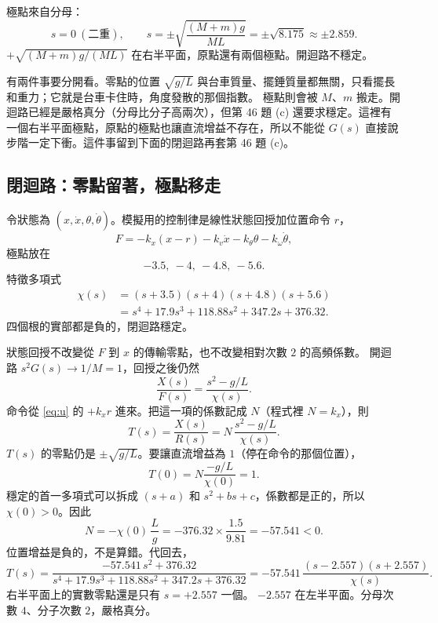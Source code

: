 \documentclass[12pt,a4paper]{article}
\begin{document}
極點來自分母：
\begin{equation}
  s=0\ (\text{二重}),\qquad
  s=\pm\sqrt{\frac{(M+m)g}{ML}}
   =\pm\sqrt{8.175}\approx\pm 2.859.
  \label{eq:ol-poles}
\end{equation}
\(+\sqrt{(M+m)g/(ML)}\) 在右半平面，原點還有兩個極點。開迴路不穩定。

有兩件事要分開看。零點的位置 \(\sqrt{g/L}\) 與台車質量、擺錘質量都無關，只看擺長和重力；它就是台車卡住時，角度發散的那個指數。
極點則會被 \(M\)、\(m\) 搬走。開迴路已經是嚴格真分（分母比分子高兩次），但第 46 題 (c) 還要求穩定。這裡有一個右半平面極點，原點的極點也讓直流增益不存在，所以不能從 \(G(s)\) 直接說步階一定下衝。這件事留到下面的閉迴路再套第 46 題 (c)。

\subsection{閉迴路：零點留著，極點移走}

令狀態為 \((x,\dot x,\theta,\dot\theta)\)。模擬用的控制律是線性狀態回授加位置命令 \(r\)，
\begin{equation}
  F=-k_x(x-r)-k_v\dot x-k_\theta\theta-k_\omega\dot\theta,
  \label{eq:u}
\end{equation}
極點放在
\[
  -3.5,\ -4,\ -4.8,\ -5.6.
\]
特徵多項式
\begin{align}
  \chi(s)&=(s+3.5)(s+4)(s+4.8)(s+5.6) \nonumber\\
         &=s^4+17.9s^3+118.88s^2+347.2s+376.32.
  \label{eq:chi}
\end{align}
四個根的實部都是負的，閉迴路穩定。

狀態回授不改變從 \(F\) 到 \(x\) 的傳輸零點，也不改變相對次數 \(2\) 的高頻係數。
開迴路 \(s^2G(s)\to 1/M=1\)，回授之後仍然
\[
  \frac{X(s)}{F(s)}=\frac{s^2-g/L}{\chi(s)}.
\]
命令從 \eqref{eq:u} 的 \(+k_x r\) 進來。把這一項的係數記成 \(N\)（程式裡 \(N=k_x\)），則
\begin{equation}
  T(s)=\frac{X(s)}{R(s)}=N\,\frac{s^2-g/L}{\chi(s)}.
  \label{eq:T}
\end{equation}
\(T(s)\) 的零點仍是 \(\pm\sqrt{g/L}\)。要讓直流增益為 \(1\)（停在命令的那個位置），
\[
  T(0)=N\frac{-g/L}{\chi(0)}=1.
\]
穩定的首一多項式可以拆成 \((s+a)\) 和 \(s^2+bs+c\)，係數都是正的，所以 \(\chi(0)>0\)。因此
\begin{equation}
  N=-\chi(0)\,\frac{L}{g}
   =-376.32\times\frac{1.5}{9.81}
   =-57.541<0.
  \label{eq:N}
\end{equation}
位置增益是負的，不是算錯。代回去，
\begin{equation}
  T(s)=\frac{-57.541\,s^2+376.32}{s^4+17.9s^3+118.88s^2+347.2s+376.32}
      =-57.541\,\frac{(s-2.557)(s+2.557)}{\chi(s)}.
  \label{eq:Tnum}
\end{equation}
右半平面上的實數零點還是只有 \(s=+2.557\) 一個。
\(-2.557\) 在左半平面。分母次數 \(4\)、分子次數 \(2\)，嚴格真分。
\end{document}
